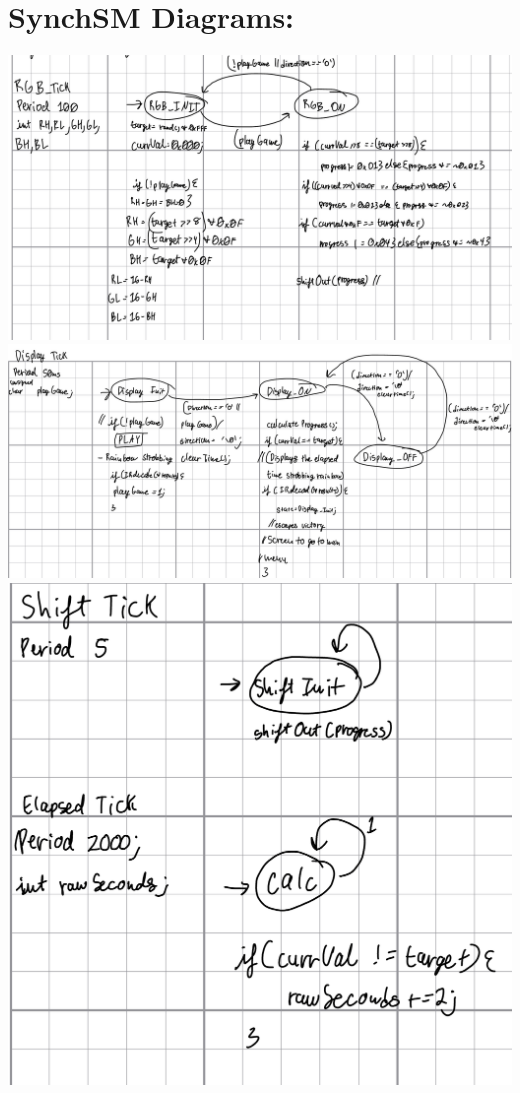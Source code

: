 \documentclass[12pt]{article}
\begin{document}
\section{SynchSM Diagrams:}
    \includegraphics[width=\textwidth]{RGBTick.png}
    \includegraphics[width=\textwidth]{DisplayTick.png}
    \includegraphics[width=\textwidth]{ShiftTick.png}
\end{document}
